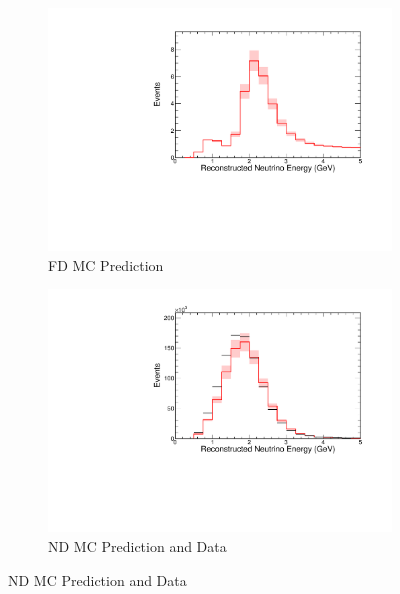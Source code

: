 {\begin{figure}
\end{figure}



\begin{figure}
\begin{center}
\begin{subfigure}[c]{0.49\textwidth}
\includegraphics[width=\textwidth]{figures/systs/prediction/fd_mc_prediction_MaCCRES.pdf}
\caption*{FD MC Prediction}
\end{subfigure}
\begin{subfigure}[c]{0.49\textwidth}
\includegraphics[width=\textwidth]{figures/systs/prediction/nd_mc_prediction_MaCCRES.pdf}
\caption*{ND MC Prediction and Data}
\end{subfigure}

\vspace{20pt}


\end{center}
\end{figure}}
